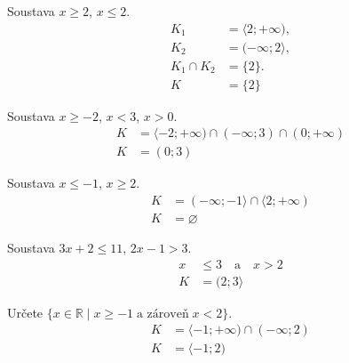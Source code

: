 \documentclass[11pt,a4paper]{article}
\begin{document}
\begin{zadaniReseniBox}[title={Samostatná práce 1}]
Soustava $x\ge2$, $x\le2$.
\tcblower
\[
\begin{aligned}
K_1&=\langle2;+\infty),\\
K_2&=(-\infty;2\rangle,\\
K_1\cap K_2&=\{2\}. \\[2mm]
K &= \{2\}
\end{aligned}
\]
\end{zadaniReseniBox}

\begin{zadaniReseniBox}[title={Samostatná práce 2}]
Soustava $x\ge-2$, $x<3$, $x>0$.
\tcblower
\[
\begin{aligned}
K&=\langle-2;+\infty)\cap(-\infty;3)\cap(0;+\infty) \\[2mm]
K &= (0;3)
\end{aligned}
\]
\end{zadaniReseniBox}
\begin{zadaniReseniBox}[title={Samostatná práce 3}]
Soustava $x\le-1$, $x\ge2$.
\tcblower
\[
\begin{aligned}
K&=(-\infty;-1\rangle\cap\langle2;+\infty) \\[2mm]
K &= \varnothing
\end{aligned}
\]
\end{zadaniReseniBox}
\begin{zadaniReseniBox}[title={Samostatná práce 4}]
Soustava $3x+2\le11$, $2x-1>3$.
\tcblower
\[
\begin{aligned}
x&\le3\quad\text{a}\quad x>2 \\[2mm]
K &= (2;3\rangle
\end{aligned}
\]
\end{zadaniReseniBox}
\begin{zadaniReseniBox}[title={Samostatná práce 5}]
Určete $\{x\in\mathbb R\mid x\ge-1\;\text{a zároveň}\;x<2\}$.
\tcblower
\[
\begin{aligned}
K&=\langle-1;+\infty)\cap(-\infty;2) \\[2mm]
K &= \langle-1;2)
\end{aligned}
\]
\end{zadaniReseniBox}
\end{document}
